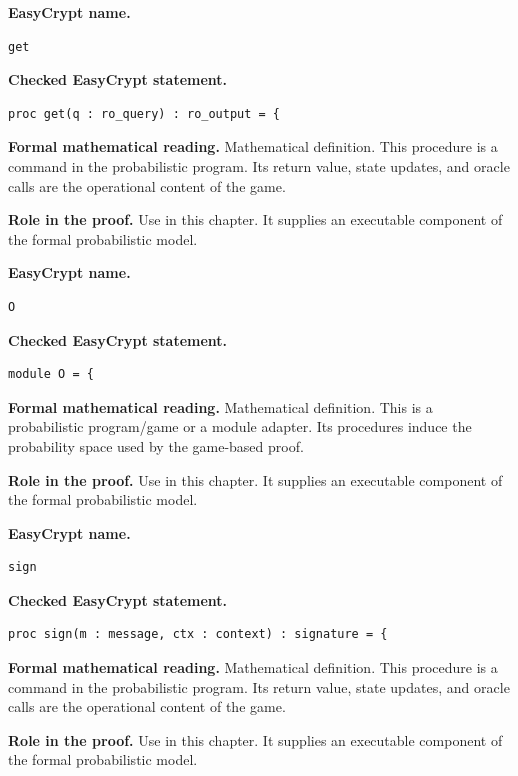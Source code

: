 \begin{formaldefinition}
\noindent\textbf{EasyCrypt name.}
\begin{lstlisting}[language=EasyCrypt,basicstyle=\ttfamily\scriptsize]
get
\end{lstlisting}
\noindent\textbf{Checked EasyCrypt statement.}
\begin{lstlisting}[language=EasyCrypt,basicstyle=\ttfamily\scriptsize]
proc get(q : ro_query) : ro_output = {
\end{lstlisting}
\noindent\textbf{Formal mathematical reading.}
Mathematical definition. This procedure is a command in the probabilistic program.  Its return value, state updates, and oracle calls are the operational content of the game.

\noindent\textbf{Role in the proof.}
Use in this chapter. It supplies an executable component of the formal probabilistic model.

\end{formaldefinition}

\begin{formaldefinition}
\noindent\textbf{EasyCrypt name.}
\begin{lstlisting}[language=EasyCrypt,basicstyle=\ttfamily\scriptsize]
O
\end{lstlisting}
\noindent\textbf{Checked EasyCrypt statement.}
\begin{lstlisting}[language=EasyCrypt,basicstyle=\ttfamily\scriptsize]
module O = {
\end{lstlisting}
\noindent\textbf{Formal mathematical reading.}
Mathematical definition. This is a probabilistic program/game or a module adapter.  Its procedures induce the probability space used by the game-based proof.

\noindent\textbf{Role in the proof.}
Use in this chapter. It supplies an executable component of the formal probabilistic model.

\end{formaldefinition}

\begin{formaldefinition}
\noindent\textbf{EasyCrypt name.}
\begin{lstlisting}[language=EasyCrypt,basicstyle=\ttfamily\scriptsize]
sign
\end{lstlisting}
\noindent\textbf{Checked EasyCrypt statement.}
\begin{lstlisting}[language=EasyCrypt,basicstyle=\ttfamily\scriptsize]
proc sign(m : message, ctx : context) : signature = {
\end{lstlisting}
\noindent\textbf{Formal mathematical reading.}
Mathematical definition. This procedure is a command in the probabilistic program.  Its return value, state updates, and oracle calls are the operational content of the game.

\noindent\textbf{Role in the proof.}
Use in this chapter. It supplies an executable component of the formal probabilistic model.

\end{formaldefinition}

